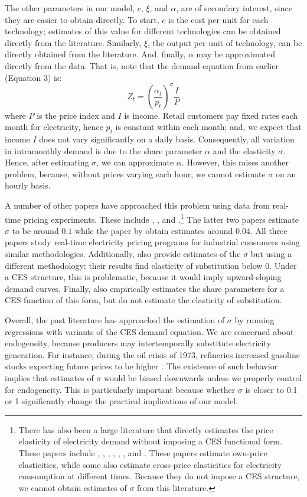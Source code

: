 \documentclass[11pt,a4paper]{extarticle}
\begin{document}
The other parameters in our model, $c$,  $\xi$, and $\alpha$, are of secondary interest, since they are easier to obtain directly. To start, $c$ is the cost per unit for each technology; estimates of this value for different technologies can be obtained directly from the literature. Similarly, $\xi$, the output per unit of technology, can be directly obtained from the literature. And, finally, $\alpha$ may be approximated directly from the data. That is, note that the demand equation from earlier (Equation 3) is:
$$Z_t = \left(\frac{\alpha_t}{p_t} \right)^\sigma \frac{I}{P}$$
where $P$ is the price index and $I$ is income. Retail customers pay fixed rates each month for electricity, hence $p_t$ is constant within each month; and, we expect that income $I$ does not vary significantly on a daily basis. Consequently, all variation in intramonthly demand is due to the share parameter $\alpha$ and the elasticity $\sigma$. Hence, after estimating $\sigma$, we can approximate $\alpha$. However, this raises another problem, because, without prices varying each hour, we cannot estimate  $\sigma$ on an hourly basis. 


A number of other papers have approached this problem using data from real-time pricing experiments. These include \citet{Schwarz}, \citet{Herriges}, and \citet{KS1994}.\footnote{ There has also been a large literature that directly estimates the price elasticity of electricity demand without imposing a CES functional form. These papers include \citet{Wolak}, \citet{Zarnikau}, \citet{Woo}, \citet{Zhou}, \citet{Reiss}, \citet{Fan}, and \citet{Deryugina}. These papers estimate own-price elasticities, while some also estimate cross-price elasticities for electricity consumption at different times. Because they do not impose a CES structure, we cannot obtain estimates of $\sigma$ from this literature. }
The latter two papers estimate $\sigma$ to be around $0.1$ while the paper by \citeauthor{Schwarz}  obtain estimates around $0.04$. All three papers study real-time electricity pricing programs for industrial consumers using similar methodologies. Additionally, \citet{Aubin} also provide estimates of the $\sigma$ but using a different methodology; their results find elasticity of substitution below 0. Under a CES structure, this is problematic, because it would imply upward-sloping demand curves. Finally, \citet{Moha2016} also empirically estimates the share parameters for a CES function of this form, but do not estimate the elasticity of substitution. 

Overall, the past literature has approached the estimation of $\sigma$ by running regressions with variants of the CES demand equation.  We are concerned about endogeneity, because producers may intertemporally substitute electricity generation. For instance, during the oil crisis of 1973, refineries increased gasoline stocks expecting future prices to be higher \citep{genie}. The existence of such behavior implies that estimates of $\sigma$ would be biased downwards unless we properly control for endogeneity. This is particularly important because whether $\sigma$ is closer to 0.1 or 1 significantly change the practical implications of our model. 
\end{document}
